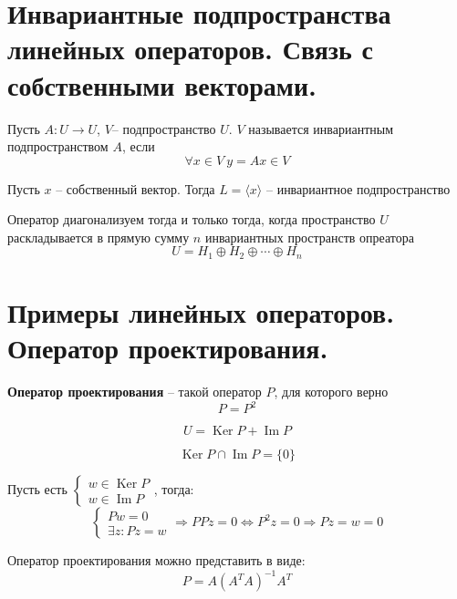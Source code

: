 \documentclass[14pt]{extreport}
\DeclareMathOperator{\Ima}{Im}
\DeclareMathOperator{\Ker}{Ker}
\begin{document}
    \chapter{Инвариантные подпространства линейных операторов. Связь с собственными векторами.}
    \begin{defbox}
        Пусть $A: U \rightarrow U$, $V $-- подпространство $U$. $V$ называется инвариантным подпространством $A$, если 
        $$
        \forall x \in V \: y=Ax\in V
        $$
    \end{defbox}
    \begin{thbox}
        Пусть $x$ -- собственный вектор. Тогда $L = \langle x \rangle$ -- инвариантное подпространство
    \end{thbox}
    \begin{thbox}
        Оператор диагонализуем тогда и только тогда, когда пространство $U$ раскладывается в прямую сумму $n$ инвариантных пространств опреатора
        $$
        U = H_1 \oplus H_2 \oplus \cdots \oplus H_n
        $$
    \end{thbox}

    \chapter{Примеры линейных операторов. Оператор проектирования.}
    \begin{defbox}
        \textbf{Оператор проектирования} -- такой оператор $P$, для которого верно
        $$
        P = P^2
        $$
    \end{defbox}
    \begin{thbox}
        $$
        U = \Ker P + \Ima P
        $$
    \end{thbox}
    \begin{thbox}
        $$
        \Ker P \cap \Ima P = \lbrace 0 \rbrace
        $$
    \end{thbox}
    \begin{prbox}
        Пусть есть $\begin{cases}w \in \Ker P\\w \in \Ima P\end{cases}$, тогда:
        $$
        \begin{cases}
            Pw = 0\\
            \exists z : Pz = w
        \end{cases}
        \Rightarrow
        PPz = 0 \Leftrightarrow P^2z=0 \Rightarrow Pz = w = 0
        $$
    \end{prbox}
    \begin{thbox}
        Оператор проектирования можно представить в виде:
        $$
        P = A(A^TA)^{-1}A^T
        $$
    \end{thbox}
\end{document}
